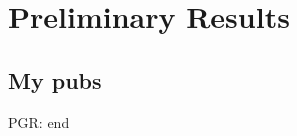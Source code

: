 \documentclass[12pt]{article}
\DeclareMathOperator{\xrm}{\mathrm{x}}
\DeclareMathOperator{\yrm}{\mathrm{y}}
\DeclareMathOperator{\Drm}{\mathrm{D}}
\DeclareMathOperator{\Prm}{\mathrm{P}}
\DeclareMathOperator{\prm}{\mathrm{p}}
\DeclareMathOperator{\Xcal}{\mathcal{X}}
\DeclareMathOperator{\Ycal}{\mathcal{Y}}
\DeclareMathOperator{\Rbb}{\mathbb{R}}
\DeclareMathOperator{\Dir}{\mathrm{Dir}}
\begin{document}
\newpage
\section{Preliminary Results} \label{sec:results}

\subsection{My pubs}

PGR: end

%
%
%
%
%
%
%
%
\end{document}
